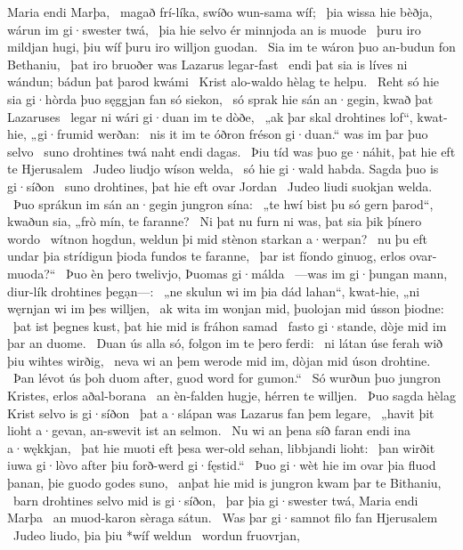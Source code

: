Maria endi Marþa, \hld\ magað frí-líka,
swíðo wun-sama wíf; \hld\ þia wissa hie bèðja,
wárun im gi·swester twá, \hld\ þia hie selvo ér
minnjoda an is muode \hld\ þuru iro mildjan hugi,
þiu wíf þuru iro willjon guodan. \hld\ Sia im te wáron þuo
an-budun fon Bethaniu, \hld\ þat iro bruoðer was
Lazarus legar-fast \hld\ endi þat sia is líves ni wándun;
bádun þat þarod kwámi \hld\ Krist alo-waldo
hèlag te helpu. \hld\ Reht só hie sia gi·hòrda þuo
sęggjan fan só siekon, \hld\ só sprak hie sán an·gegin,
kwað þat Lazaruses \hld\ legar ni wári
gi·duan im te dòðe, \hld\ „ak þar skal drohtines lof“, kwat-hie,
„gi·frumid werðan: \hld\ nis it im te óðron fréson gi·duan.“
was im þar þuo selvo \hld\ suno drohtines
twá naht endi dagas. \hld\ Þiu tíd was þuo ge·náhit,
þat hie eft te Hjerusalem \hld\ Judeo liudjo
wíson welda, \hld\ só hie gi·wald habda.
Sagda þuo is gi·síðon \hld\ suno drohtines,
þat hie eft ovar Jordan \hld\ Judeo liudi
suokjan welda. \hld\ Þuo sprákun im sán an·gegin
jungron sína: \hld\ „te hwí bist þu só gern þarod“, kwaðun sia,
„frò mín, te faranne? \hld\ Ni þat nu furn ni was,
þat sia þik þínero wordo \hld\ wítnon hogdun,
weldun þi mid stènon starkan a·werpan? \hld\ nu þu eft undar þia strídigun þioda
fundos te faranne, \hld\ þar ist fíondo ginuog,
erlos ovar-muoda?“ \hld\ Þuo èn þero twelivjo,
Þuomas gi·málda \hld\ —was im gi·þungan mann,
diur-lík drohtines þegạn—: \hld\ „ne skulun wi im þia dád lahan“, kwat-hie,
„ni węrnjan wi im þes willjen, \hld\ ak wita im wonjan mid,
þuolojan mid ússon þiodne: \hld\ þat ist þegnes kust,
þat hie mid is fráhon samad \hld\ fasto gi·stande,
dòje mid im þar an duome. \hld\ Duan ús alla só,
folgon im te þero ferdi: \hld\ ni látan úse ferah wið þiu
wihtes wirðig, \hld\ neva wi an þem werode mid im,
dòjan mid úson drohtine. \hld\ Þan lévot ús þoh duom after,
guod word for gumon.“ \hld\ Só wurðun þuo jungron Kristes,
erlos aðal-borana \hld\ an èn-falden hugje,
hérren te willjen. \hld\ Þuo sagda hèlag Krist
selvo is gi·síðon \hld\ þat a·slápan was
Lazarus fan þem legare, \hld\ „havit þit lioht a·gevan,
an-swevit ist an selmon. \hld\ Nu wi an þena síð faran
endi ina a·wękkjan, \hld\ þat hie muoti eft þesa wer-old sehan,
libbjandi lioht: \hld\ þan wirðit iuwa gi·lòvo after þiu
forð-werd gi·fęstid.“ \hld\ Þuo gi·wèt hie im ovar þia fluod þanan,
þie guodo godes suno, \hld\ anþat hie mid is jungron kwam
þar te Bithaniu, \hld\ barn drohtines
selvo mid is gi·síðon, \hld\ þar þia gi·swester twá,
Maria endi Marþa \hld\ an muod-karon
sèraga sátun. \hld\ Was þar gi·samnot filo
fan Hjerusalem \hld\ Judeo liudo,
þia þiu *wíf weldun \hld\ wordun fruovrjan,
